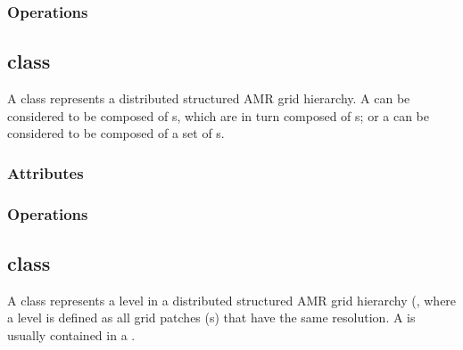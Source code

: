 \documentclass{article}
\begin{document}
\subsubsection{Operations}

\subsection{ class}

A  class represents a distributed structured AMR grid
hierarchy.  A  can be considered to be composed of
s, which are in turn composed of s; or a 
can be considered to be composed of a set of s.


\subsubsection{Attributes}

\subsubsection{Operations}

\subsection{ class}

A  class represents a level in a distributed structured
AMR grid hierarchy (, where a level is defined as all
grid patches (s) that have the same resolution.  A 
is usually contained in a .

\end{document}
